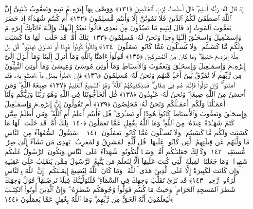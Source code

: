  إِذ قَالَ لَهُۥ رَبُّهُۥٓ أَسلِم ۖ قَالَ أَسلَمتُ لِرَبِّ ٱلعَـٰلَمِينَ ﴿١٣١﴾
 وَوَصَّىٰ بِهَآ إِبرَٰهِۦمُ بَنِيهِ وَيَعقُوبُ يَـٰبَنِىَّ إِنَّ ٱللَّهَ ٱصطَفَىٰ لَكُمُ ٱلدِّينَ فَلَا تَمُوتُنَّ إِلَّا وَأَنتُم مُّسلِمُونَ ﴿١٣٢﴾
 أَم كُنتُم شُهَدَآءَ إِذ حَضَرَ يَعقُوبَ ٱلمَوتُ إِذ قَالَ لِبَنِيهِ مَا تَعبُدُونَ مِنۢ بَعدِى قَالُوا۟ نَعبُدُ إِلَـٰهَكَ وَإِلَـٰهَ ءَابَآئِكَ إِبرَٰهِۦمَ وَإِسمَـٰعِيلَ وَإِسحَـٰقَ إِلَـٰهًۭا وَٟحِدًۭا وَنَحنُ لَهُۥ مُسلِمُونَ ﴿١٣٣﴾
 تِلكَ أُمَّةٌۭ قَد خَلَت ۖ لَهَا مَا كَسَبَت وَلَكُم مَّا كَسَبتُم ۖ وَلَا تُسـَٔلُونَ عَمَّا كَانُوا۟ يَعمَلُونَ ﴿١٣٤﴾
 وَقَالُوا۟ كُونُوا۟ هُودًا أَو نَصَـٰرَىٰ تَهتَدُوا۟ ۗ قُل بَل مِلَّةَ إِبرَٰهِۦمَ حَنِيفًۭا ۖ وَمَا كَانَ مِنَ ٱلمُشرِكِينَ ﴿١٣٥﴾
 قُولُوٓا۟ ءَامَنَّا بِٱللَّهِ وَمَآ أُنزِلَ إِلَينَا وَمَآ أُنزِلَ إِلَىٰٓ إِبرَٰهِۦمَ وَإِسمَـٰعِيلَ وَإِسحَـٰقَ وَيَعقُوبَ وَٱلأَسبَاطِ وَمَآ أُوتِىَ مُوسَىٰ وَعِيسَىٰ وَمَآ أُوتِىَ ٱلنَّبِيُّونَ مِن رَّبِّهِم لَا نُفَرِّقُ بَينَ أَحَدٍۢ مِّنهُم وَنَحنُ لَهُۥ مُسلِمُونَ ﴿١٣٦﴾
 فَإِن ءَامَنُوا۟ بِمِثلِ مَآ ءَامَنتُم بِهِۦ فَقَدِ ٱهتَدَوا۟ ۖ وَّإِن تَوَلَّوا۟ فَإِنَّمَا هُم فِى شِقَاقٍۢ ۖ فَسَيَكفِيكَهُمُ ٱللَّهُ ۚ وَهُوَ ٱلسَّمِيعُ ٱلعَلِيمُ ﴿١٣٧﴾
 صِبغَةَ ٱللَّهِ ۖ وَمَن أَحسَنُ مِنَ ٱللَّهِ صِبغَةًۭ ۖ وَنَحنُ لَهُۥ عَـٰبِدُونَ ﴿١٣٨﴾
 قُل أَتُحَآجُّونَنَا فِى ٱللَّهِ وَهُوَ رَبُّنَا وَرَبُّكُم وَلَنَآ أَعمَـٰلُنَا وَلَكُم أَعمَـٰلُكُم وَنَحنُ لَهُۥ مُخلِصُونَ ﴿١٣٩﴾
 أَم تَقُولُونَ إِنَّ إِبرَٰهِۦمَ وَإِسمَـٰعِيلَ وَإِسحَـٰقَ وَيَعقُوبَ وَٱلأَسبَاطَ كَانُوا۟ هُودًا أَو نَصَـٰرَىٰ ۗ قُل ءَأَنتُم أَعلَمُ أَمِ ٱللَّهُ ۗ وَمَن أَظلَمُ مِمَّن كَتَمَ شَهَـٰدَةً عِندَهُۥ مِنَ ٱللَّهِ ۗ وَمَا ٱللَّهُ بِغَٰفِلٍ عَمَّا تَعمَلُونَ ﴿١٤٠﴾
 تِلكَ أُمَّةٌۭ قَد خَلَت ۖ لَهَا مَا كَسَبَت وَلَكُم مَّا كَسَبتُم ۖ وَلَا تُسـَٔلُونَ عَمَّا كَانُوا۟ يَعمَلُونَ ﴿١٤١﴾
 ۞ سَيَقُولُ ٱلسُّفَهَآءُ مِنَ ٱلنَّاسِ مَا وَلَّىٰهُم عَن قِبلَتِهِمُ ٱلَّتِى كَانُوا۟ عَلَيهَا ۚ قُل لِّلَّهِ ٱلمَشرِقُ وَٱلمَغرِبُ ۚ يَهدِى مَن يَشَآءُ إِلَىٰ صِرَٰطٍۢ مُّستَقِيمٍۢ ﴿١٤٢﴾
 وَكَذَٟلِكَ جَعَلنَـٰكُم أُمَّةًۭ وَسَطًۭا لِّتَكُونُوا۟ شُهَدَآءَ عَلَى ٱلنَّاسِ وَيَكُونَ ٱلرَّسُولُ عَلَيكُم شَهِيدًۭا ۗ وَمَا جَعَلنَا ٱلقِبلَةَ ٱلَّتِى كُنتَ عَلَيهَآ إِلَّا لِنَعلَمَ مَن يَتَّبِعُ ٱلرَّسُولَ مِمَّن يَنقَلِبُ عَلَىٰ عَقِبَيهِ ۚ وَإِن كَانَت لَكَبِيرَةً إِلَّا عَلَى ٱلَّذِينَ هَدَى ٱللَّهُ ۗ وَمَا كَانَ ٱللَّهُ لِيُضِيعَ إِيمَـٰنَكُم ۚ إِنَّ ٱللَّهَ بِٱلنَّاسِ لَرَءُوفٌۭ رَّحِيمٌۭ ﴿١٤٣﴾
 قَد نَرَىٰ تَقَلُّبَ وَجهِكَ فِى ٱلسَّمَآءِ ۖ فَلَنُوَلِّيَنَّكَ قِبلَةًۭ تَرضَىٰهَا ۚ فَوَلِّ وَجهَكَ شَطرَ ٱلمَسجِدِ ٱلحَرَامِ ۚ وَحَيثُ مَا كُنتُم فَوَلُّوا۟ وُجُوهَكُم شَطرَهُۥ ۗ وَإِنَّ ٱلَّذِينَ أُوتُوا۟ ٱلكِتَـٰبَ لَيَعلَمُونَ أَنَّهُ ٱلحَقُّ مِن رَّبِّهِم ۗ وَمَا ٱللَّهُ بِغَٰفِلٍ عَمَّا يَعمَلُونَ ﴿١٤٤﴾
